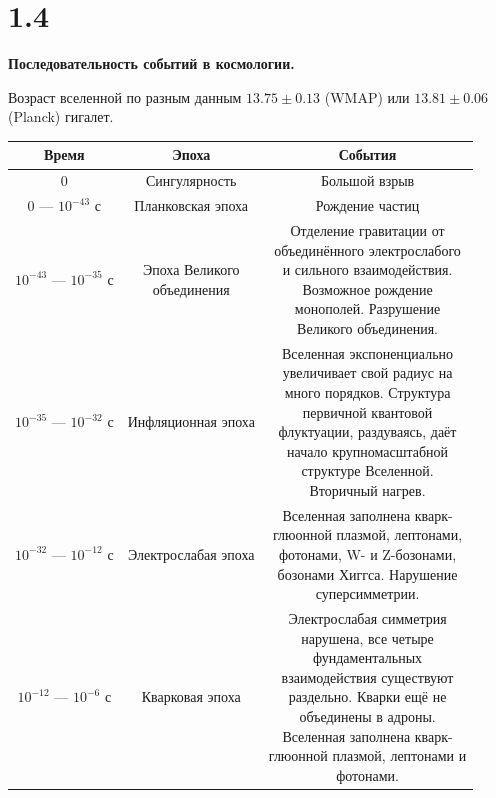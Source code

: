 \documentclass[a4paper,14pt]{article}
\makeatletter
\newcommand{\specialcell}[2][c]{%
  \begin{tabular}[#1]{@{}c@{}}#2\end{tabular}}
\makeatother
\begin{document}
\section*{1.4}
\begin{center}
	\LARGE{\textbf{Последовательность событий в космологии.}}
\end{center}
\begin{center}
	Возраст вселенной по разным данным $13.75 \pm 0.13$ (WMAP) или $13.81 \pm 0.06$ (Planck) гигалет.
\end{center}
\begin{center}
\begin{longtable}{|c|c|c|}
\hline
 Время& Эпоха& События\\
\hline
 0& Сингулярность& Большой взрыв\\
\hline
 0 — $10^{-43}$ с& Планковская эпоха& Рождение частиц\\
\hline
 $10^{-43}$ — $10^{-35}$ с & \specialcell{Эпоха Великого\\объединения}& \specialcell{Отделение гравитации от\\ объединённого электрослабого\\ и сильного взаимодействия.\\ Возможное рождение\\ монополей. Разрушение\\ Великого объединения.} \\
\hline
 $10^{-35}$ — $10^{-32}$ с& Инфляционная эпоха& \specialcell{Вселенная экспоненциально\\ увеличивает свой радиус на\\ много порядков. Структура\\ первичной квантовой\\ флуктуации, раздуваясь, даёт\\ начало крупномасштабной\\ структуре Вселенной.\\ Вторичный нагрев.} \\
\hline
 $10^{-32}$ — $10^{-12}$ с& Электрослабая эпоха& \specialcell{Вселенная заполнена кварк-\\глюонной плазмой, лептонами,\\ фотонами, W- и Z-бозонами,\\ бозонами Хиггса. Нарушение\\ суперсимметрии.} \\
\hline
 $10^{-12}$ — $10^{-6}$ с& Кварковая эпоха& \specialcell{Электрослабая симметрия\\ нарушена, все четыре\\ фундаментальных\\ взаимодействия существуют\\ раздельно. Кварки ещё не\\ объединены в адроны.\\ Вселенная заполнена кварк-\\глюонной плазмой, лептонами и\\ фотонами.} \\

\end{longtable}
\end{center}
\end{document}
